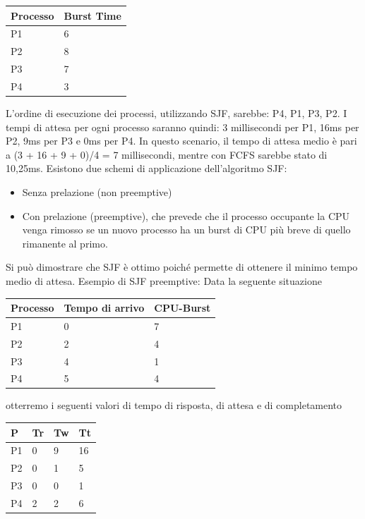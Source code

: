 \documentclass[a4paper]{article}
\begin{document}
\begin{table}[htb]
   \centering
   \label{my-label}
   \begin{tabular}{ll}
      Processo & Burst Time \\ \hline
      P1       & 6          \\
      P2       & 8          \\
      P3       & 7          \\
      P4       & 3
   \end{tabular}
\end{table}

L'ordine di esecuzione dei processi, utilizzando SJF, sarebbe: P4, P1, P3, P2. I tempi di attesa per ogni processo saranno quindi: 3 millisecondi per P1, 16ms per P2, 9ms per P3 e 0ms per P4. In questo scenario, il tempo di attesa medio è pari a (3 + 16 + 9 + 0)/4 = 7 millisecondi, mentre con FCFS sarebbe stato di 10,25ms. \newline
Esistono due schemi di applicazione dell'algoritmo SJF:
\begin{itemize}
\item Senza prelazione (non preemptive)
\item Con prelazione (preemptive), che prevede che il processo occupante la CPU venga rimosso se un nuovo processo ha un burst di CPU più breve di quello rimanente al primo.
\end {itemize}
Si può dimostrare che SJF è ottimo poiché permette di ottenere il minimo tempo medio di attesa.
Esempio di SJF preemptive:\newline
Data la seguente situazione
\begin{table}[htb]
   \centering
   \label{my-label}
   \begin{tabular}{lll}
      Processo & Tempo di arrivo & CPU-Burst \\ \hline
      P1       & 0               & 7         \\
      P2       & 2               & 4         \\
      P3       & 4               & 1         \\
      P4       & 5               & 4
   \end{tabular}
\end{table}

otterremo i seguenti valori di tempo di risposta, di attesa e di completamento

\begin{table}[htb]
   \centering
   \label{my-label}
   \begin{tabular}{llll}
      P  & Tr & Tw & Tt \\ \hline
      P1 & 0  & 9  & 16 \\
      P2 & 0  & 1  & 5  \\
      P3 & 0  & 0  & 1  \\
      P4 & 2  & 2  & 6
   \end{tabular}
\end{table}
\end{document}
